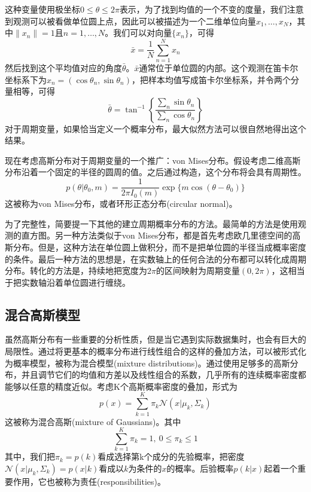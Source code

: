 这种变量使用极坐标$0\leqslant \theta \leqslant 2\pi$表示，为了找到均值的一个不变的度量，我们注意到观测可以被看做单位圆上点，因此可以被描述为一个二维单位向量$x_1,\dots,x_N$，其中$\lVert x_n\rVert=1$且$n=1,\dots,N$。我们可以对向量$\{x_n \}$，可得
\begin{equation}
	\bar{x}=\frac{1}{N}\sum_{n=1}^{N}x_n
\end{equation}
然后找到这个平均值对应的角度$\bar{\theta}$。$\bar{x}$通常位于单位圆的内部。这个观测在笛卡尔坐标系下为$x_n=(\cos \theta_n,\sin \theta_n)$，把样本均值写成笛卡尔坐标系，并令两个分量相等，可得
\begin{equation}
	\bar{\theta}=\tan^{-1}\left\{\frac{\sum_n\sin\theta_n}{\sum_n \cos\theta_n} \right\}
\end{equation}
对于周期变量，如果恰当定义一个概率分布，最大似然方法可以很自然地得出这个结果。

现在考虑高斯分布对于周期变量的一个推广：von Mises分布。假设考虑二维高斯分布沿着一个固定的半径的圆周的值。之后通过构造，这个分布将会具有周期性。
\begin{equation}
	p(\theta|\theta_0,m)=\frac{1}{2\pi I_0(m)}\exp\{m\cos (\theta -\theta_0) \}
\end{equation}
这被称为von Mises分布，或者环形正态分布(circular normal)。

为了完整性，简要提一下其他的建立周期概率分布的方法。最简单的方法是使用观测的直方图。另一种方法类似于von Mises分布，都是首先考虑欧几里德空间的高斯分布。但是，这种方法在单位圆上做积分，而不是把单位圆的半径当成概率密度的条件。最后一种方法的思想是，在实数轴上的任何合法的分布都可以转化成周期分布。转化的方法是，持续地把宽度为$2\pi$的区间映射为周期变量$(0,2\pi)$，这相当于把实数轴沿着单位圆进行缠绕。
\subsection*{混合高斯模型}
虽然高斯分布有一些重要的分析性质，但是当它遇到实际数据集时，也会有巨大的局限性。通过将更基本的概率分布进行线性组合的这样的叠加方法，可以被形式化为概率模型，被称为混合模型(mixture distributions)。通过使用足够多的高斯分布，并且调节它们的均值和方差以及线性组合的系数，几乎所有的连续概率密度都能够以任意的精度近似。考虑K个高斯概率密度的叠加，形式为
\begin{equation}
	p(x)=\sum_{k=1}^{K}\pi_k\mathcal{N}(x|\mu_k,\Sigma_k)
\end{equation}
这被称为混合高斯(mixture of Gaussians)。其中
\begin{equation}
	\sum_{k=1}^{K}\pi_k=1,\ 0\leqslant \pi_k \leqslant 1
\end{equation}
其中，我们把$\pi_k=p(k)$看成选择第k个成分的先验概率，把密度$\mathcal{N}(x|\mu_k,\Sigma_k)=p(x|k)$看成以$k$为条件的$x$的概率。后验概率$p(k|x)$起着一个重要作用，它也被称为责任(responsibilities)。

